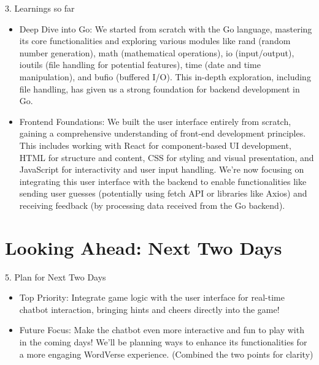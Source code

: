 \documentclass{beamer}
\begin{document}
\begin{frame}{3. Learnings so far}
  \begin{itemize}
    \item Deep Dive into Go: We started from scratch with the Go language, mastering its core functionalities and exploring various modules like rand (random number generation), math (mathematical operations), io (input/output), ioutils (file handling for potential features), time (date and time manipulation), and bufio (buffered I/O). This in-depth exploration, including file handling, has given us a strong foundation for backend development in Go.
    \item Frontend Foundations: We built the user interface entirely from scratch, gaining a comprehensive understanding of front-end development principles. This includes working with React for component-based UI development, HTML for structure and content, CSS for styling and visual presentation, and JavaScript for interactivity and user input handling. We're now focusing on integrating this user interface with the backend to enable functionalities like sending user guesses (potentially using fetch API or libraries like Axios) and receiving feedback (by processing data received from the Go backend).
  \end{itemize}
\end{frame}

\section{Looking Ahead: Next Two Days} 

\begin{frame}{5. Plan for Next Two Days}
  \begin{itemize}
    \item Top Priority: Integrate game logic  with the user interface for real-time chatbot interaction, bringing hints and cheers directly into the game!
    \item Future Focus: Make the chatbot even more interactive and fun to play with in the coming days!  We'll be planning ways to enhance its functionalities for a more engaging WordVerse experience. (Combined the two points for clarity)
  \end{itemize}
\end{frame}
\end{document}
